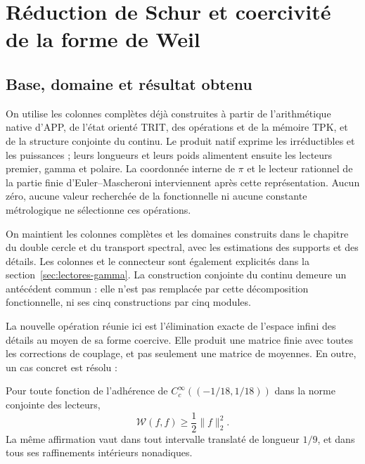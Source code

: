 \clearpage
\section{Réduction de Schur et coercivité de la forme de Weil}
\label{sec:schur-coercividad}


\subsection{Base, domaine et résultat obtenu}
\label{schur-add-sub-6}

On utilise les colonnes complètes déjà construites à partir de l'arithmétique native d'APP, de l'état orienté TRIT, des opérations et de la mémoire TPK, et de la structure conjointe du continu. Le produit natif exprime les irréductibles et les puissances ; leurs longueurs et leurs poids alimentent ensuite les lecteurs premier, gamma et polaire. La coordonnée interne de \(\pi\) et le lecteur rationnel de la partie finie d'Euler--Mascheroni interviennent après cette représentation. Aucun zéro, aucune valeur recherchée de la fonctionnelle ni aucune constante métrologique ne sélectionne ces opérations.

On maintient les colonnes complètes et les domaines construits dans le
chapitre du double cercle et du transport spectral, avec les estimations
des supports et des détails. Les colonnes et le connecteur sont également explicités dans
la section~\ref{sec:lectores-gamma}. La construction conjointe
du continu demeure un antécédent commun : elle n'est pas remplacée par cette
décomposition fonctionnelle, ni ses cinq constructions par cinq modules.

La nouvelle opération réunie ici est l'élimination exacte de l'espace infini des détails au moyen de sa forme coercive. Elle produit une matrice finie avec toutes les corrections de couplage, et pas seulement une matrice de moyennes. En outre, un cas concret est résolu :

Pour toute fonction de l'adhérence de
\(C_c^\infty((-1/18,1/18))\) dans la norme conjointe des lecteurs,
\begin{equation}
\mathscr W(f,f)\geq\frac12\|f\|_2^2.
\label{schur-add-display-1}
\end{equation}
La même affirmation vaut dans tout intervalle translaté de longueur \(1/9\), et dans tous ses raffinements intérieurs nonadiques.

